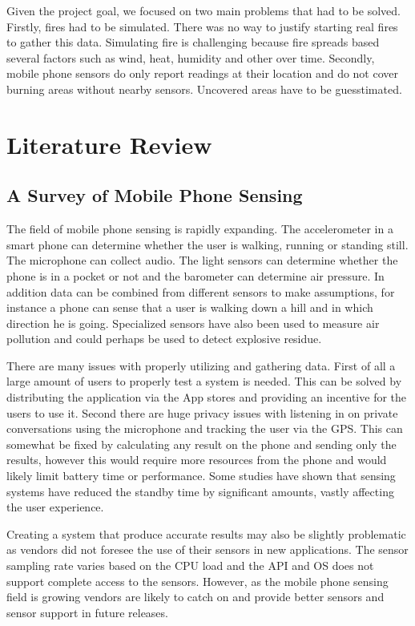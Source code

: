 Given the project goal, we focused on two main problems that had to be solved. Firstly, fires had to be simulated. There was no way to justify starting real fires to gather this data. Simulating fire is challenging because fire spreads based several factors such as wind, heat, humidity and other over time. Secondly, mobile phone sensors do only report readings at their location and do not cover burning areas without nearby sensors. Uncovered areas have to be guesstimated.

\section{Literature Review}

\subsection{A Survey of Mobile Phone Sensing}

The field of mobile phone sensing is rapidly expanding. The accelerometer in a smart phone can determine whether the user is walking, running or standing still. The microphone can collect audio. The light sensors can determine whether the phone is in a pocket or not and the barometer can determine air pressure. In addition data can be combined from different sensors to make assumptions, for instance a phone can sense that a user is walking down a hill and in which direction he is going. Specialized sensors have also been used to measure air pollution and could perhaps be used to detect explosive residue.

There are many issues with properly utilizing and gathering data. First of all a large amount of users to properly test a system is needed. This can be solved by distributing the application via the App stores and providing an incentive for the users to use it. Second there are huge privacy issues with listening in on private conversations using the microphone and tracking the user via the GPS. This can somewhat be fixed by calculating any result on the phone and sending only the results, however this would require more resources from the phone and would likely limit battery time or performance. Some studies have shown that sensing systems have reduced the standby time by significant amounts, vastly affecting the user experience.

Creating a system that produce accurate results may also be slightly problematic as vendors did not foresee the use of their sensors in new applications. The sensor sampling rate varies based on the CPU load and the API and OS does not support complete access to the sensors. However, as the mobile phone sensing field is growing vendors are likely to catch on and provide better sensors and sensor support in future releases.

